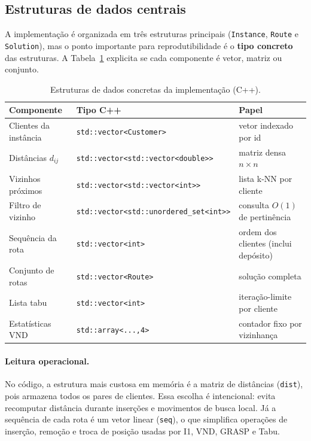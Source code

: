 \subsection{Estruturas de dados centrais}

A implementação é organizada em três estruturas principais (\texttt{Instance}, \texttt{Route} e \texttt{Solution}), mas o ponto importante para reprodutibilidade é o \textbf{tipo concreto} das estruturas.
A Tabela~\ref{tab:estruturas_cpp} explicita se cada componente é vetor, matriz ou conjunto.

\begin{table}[htbp]
\centering
\caption{Estruturas de dados concretas da implementação (C++).}
\label{tab:estruturas_cpp}
\begin{tabular}{lll}
\hline
Componente & Tipo C++ & Papel \\
\hline
Clientes da instância & \texttt{std::vector<Customer>} & vetor indexado por id \\
Distâncias $d_{ij}$ & \texttt{std::vector<std::vector<double>>} & matriz densa $n \times n$ \\
Vizinhos próximos & \texttt{std::vector<std::vector<int>>} & lista k-NN por cliente \\
Filtro de vizinho & \texttt{std::vector<std::unordered\_set<int>>} & consulta $O(1)$ de pertinência \\
Sequência da rota & \texttt{std::vector<int>} & ordem dos clientes (inclui depósito) \\
Conjunto de rotas & \texttt{std::vector<Route>} & solução completa \\
Lista tabu & \texttt{std::vector<int>} & iteração-limite por cliente \\
Estatísticas VND & \texttt{std::array<...,4>} & contador fixo por vizinhança \\
\hline
\end{tabular}
\end{table}

\paragraph{Leitura operacional.}
No código, a estrutura mais custosa em memória é a matriz de distâncias (\texttt{dist}), pois armazena todos os pares de clientes.
Essa escolha é intencional: evita recomputar distância durante inserções e movimentos de busca local.
Já a sequência de cada rota é um vetor linear (\texttt{seq}), o que simplifica operações de inserção, remoção e troca de posição usadas por I1, VND, GRASP e Tabu.

